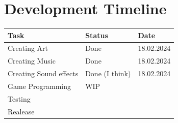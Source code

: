 \documentclass[12pt, a4paper]{article}
\begin{document}
{    \section{Development Timeline}
        \begin{table}[h]
            \centering
            \begin{tabular}{| m{4cm} | m{4cm} | m{4cm}|}\hline
                \textbf{Task} & \textbf{Status} & \textbf{Date}\\\hline\hline
                Creating Art & Done & 18.02.2024\\\hline
                Creating Music & Done & 18.02.2024\\\hline
                Creating Sound effects & Done (I think) & 18.02.2024\\\hline
                Game Programming & WIP & \\\hline
                Testing & & \\\hline
                Realease & & \\\hline
            \end{tabular}
        \end{table}
}
\end{document}
